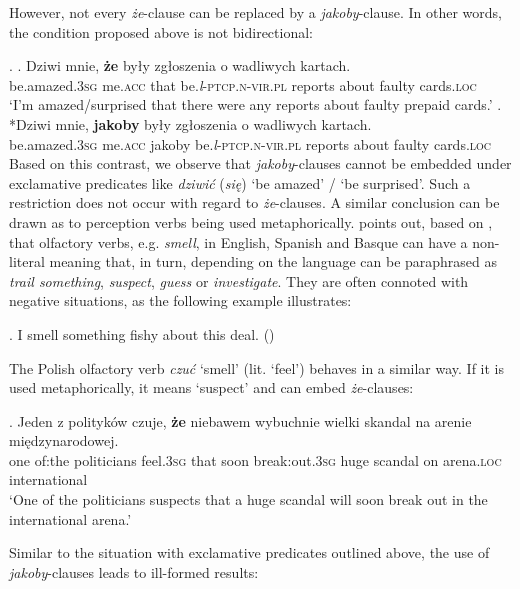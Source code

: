 \documentclass[output=paper
,modfonts
,nonflat]{langsci/langscibook}
\newcommand{\glossformat}[1]{\textsc{#1}}
\newcommand{\thirdperson}{\glossformat{3}\xspace}
\newcommand{\acc}{\glossformat{acc}\xspace}
\newcommand{\loc}{\glossformat{loc}\xspace}
\newcommand{\lptcp}{\emph{l}\glossformat{-ptcp}\xspace}
\newcommand{\nvir}{\glossformat{n-vir}\xspace}
\newcommand{\pl}{\glossformat{pl}\xspace}
\newcommand{\sg}{\glossformat{sg}\xspace}
\newcommand{\nquelle}[1]{\newline\phantom{x}\hfill(#1)}
\begin{document}
However, not every \emph{że}-clause can be replaced by a \emph{jakoby}-clause. In other words, the condition proposed above is not bidirectional:

\ex.	\ag.		Dziwi mnie, \textbf{że} były zgłoszenia o wadliwych kartach. \\
			be.amazed.{\thirdperson}{\sg} me.{\acc} that be.{\lptcp}.{\nvir}.{\pl} reports about faulty cards.{\loc} \\
			 `I'm amazed/surprised that there were any reports about faulty prepaid cards.'
	\bg.		 *Dziwi mnie, \textbf{jakoby} były zgłoszenia o wadliwych kartach. \\
			be.amazed.{\thirdperson}{\sg} me.{\acc} jakoby be.{\lptcp}.{\nvir}.{\pl} reports about faulty cards.{\loc} \\ 

Based on this contrast, we observe that \emph{jakoby}-clauses cannot be embedded under exclamative predicates like \emph{dziwić} (\emph{się})  `be amazed' / `be surprised'. Such a restriction does not occur with regard to  \emph{że}-clauses. A similar conclusion can be drawn as to perception verbs being used metaphorically. \textcite{Ibarretxe-Antunano1999} points out, based on \textcite{Sweetser1990}, that olfactory verbs, e.g. \emph{smell}, in English, Spanish and Basque can have a non-literal meaning that, in turn, depending on the language can be paraphrased as \emph{trail something}, \emph{suspect}, \emph{guess} or \emph{investigate}. They are often connoted with negative situations, as the following example illustrates: 

\ex.	I smell something fishy about this deal. \nquelle{\citealt[37]{Sweetser1990}}

The Polish olfactory verb \emph{czuć} `smell' (lit. `feel') behaves in a similar way. If it is used metaphorically, it means `suspect' and can embed \emph{że}-clauses: 

\exg.		Jeden z polityków czuje, \textbf{że} niebawem wybuchnie wielki skandal na arenie międzynarodowej. \\
		one {of:the} politicians feel.{\thirdperson}{\sg} that soon {break:out}.{\thirdperson}{\sg} huge scandal on arena.{\loc} international \\  
		`One of the politicians suspects that a huge scandal will soon break out in the international arena.'  
  
Similar to the situation with exclamative predicates outlined above, the use of \emph{jakoby}-clauses leads to ill-formed results:
\end{document}
